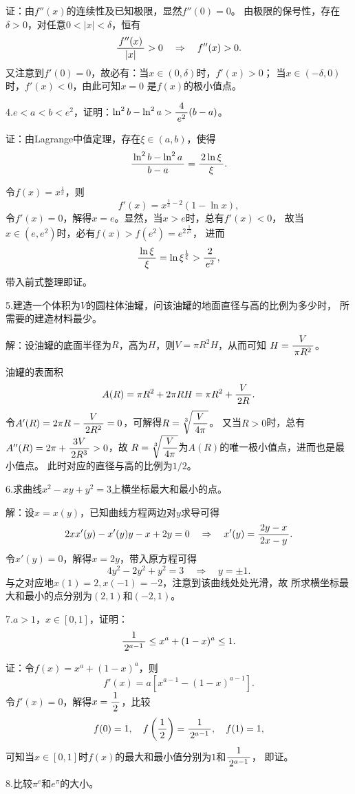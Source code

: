 证：由$f''(x)$的连续性及已知极限，显然$f''(0)=0$。
由极限的保号性，存在$\delta>0$，对任意$0<|x|<\delta$，恒有
$$\displaystyle\frac{\,{f''(x)}\,}{\,{|x|}\,}>0\quad
\Rightarrow\quad f''(x)>0.$$
又注意到$f'(0)=0$，故必有：当$x\in(0,\delta)$时，$f'(x)>0$；
当$x\in(-\delta,0)$时，$f'(x)<0$，由此可知$x=0$
是$f(x)$的极小值点。\fin

\bigskip

4.$e<a<b<e^2$，证明：$\ln^2b-\ln^2a>\displaystyle\frac{\,{4}\,}{\,{e^2}\,}(b-a)$。

证：由Lagrange中值定理，存在$\xi\in(a,b)$，使得
$$\displaystyle\frac{\,{\ln^2b-\ln^2a}\,}{\,{b-a}\,}=\displaystyle\frac{\,{2\ln\xi}\,}{\,{\xi}\,}.$$

令$f(x)=x^{\frac1x}$，则
$$f'(x)=x^{\frac1x-2}(1-\ln x),$$
令$f'(x)=0$，解得$x=e$。显然，当$x>e$时，总有$f'(x)<0$，
故当$x\in(e,e^2)$时，必有$f(x)>f(e^2)={e^2}^{\frac1{e^2}}$，
进而
$$\displaystyle\frac{\,{\ln\xi}\,}{\,{\xi}\,}=\ln\xi^{\frac1{\xi}}>\displaystyle\frac{\,{2}\,}{\,{e^2}\,},$$
带入前式整理即证。\fin

\bigskip

5.建造一个体积为$V$的圆柱体油罐，问该油罐的地面直径与高的比例为多少时，
所需要的建造材料最少。

解：设油罐的底面半径为$R$，高为$H$，则$V=\pi R^2H$，从而可知
$H=\displaystyle\frac{\,{V}\,}{\,{\pi R^2}\,}$。

油罐的表面积
$$A(R)=\pi R^2+2\pi RH=\pi R^2+\displaystyle\frac{\,{V}\,}{\,{2R}\,}.$$
令$A'(R)=2\pi R-\displaystyle\frac{\,{V}\,}{\,{2R^2}\,}=0$，可解得$R=\sqrt[3]{\displaystyle\frac{\,{V}\,}{\,{4\pi}\,}}$。
又当$R>0$时，总有$A''(R)=2\pi+\displaystyle\frac{\,{3V}\,}{\,{2R^3}\,}>0$，故
$R=\sqrt[3]{\displaystyle\frac{\,{V}\,}{\,{4\pi}\,}}$为$A(R)$的唯一极小值点，进而也是最小值点。
此时对应的直径与高的比例为$1/2$。\fin

\bigskip

6.求曲线$x^2-xy+y^2=3$上横坐标最大和最小的点。

解：设$x=x(y)$，已知曲线方程两边对$y$求导可得
$$2xx'(y)-x'(y)y-x+2y=0
\quad\Rightarrow\quad
x'(y)=\displaystyle\frac{\,{2y-x}\,}{\,{2x-y}\,}.$$
令$x'(y)=0$，解得$x=2y$，带入原方程可得
$$4y^2-2y^2+y^2=3
\quad\Rightarrow\quad
y=\pm1.$$
与之对应地$x(1)=2,x(-1)=-2$，注意到该曲线处处光滑，故
所求横坐标最大和最小的点分别为$(2,1)$和$(-2,1)$。
\fin

\bigskip

7.$a>1$，$x\in[0,1]$，证明：
$$\displaystyle\frac{\,{1}\,}{\,{2^{a-1}}\,}\leq x^a+(1-x)^a\leq 1.$$

证：令$f(x)=x^a+(1-x)^a$，则
$$f'(x)=a[x^{a-1}-(1-x)^{a-1}].$$
令$f'(x)=0$，解得$x=\displaystyle\frac{\,{1}\,}{\,{2}\,}$，比较
$$f(0)=1,\quad f\left(\displaystyle\frac{\,{1}\,}{\,{2}\,}\right)=\displaystyle\frac{\,{1}\,}{\,{2^{a-1}}\,},
\quad f(1)=1,$$
可知当$x\in[0,1]$时$f(x)$的最大和最小值分别为$1$和$\displaystyle\frac{\,{1}\,}{\,{2^{a-1}}\,}$，
即证。
\fin

\bigskip

8.比较$\pi^e$和$e^{\pi}$的大小。

